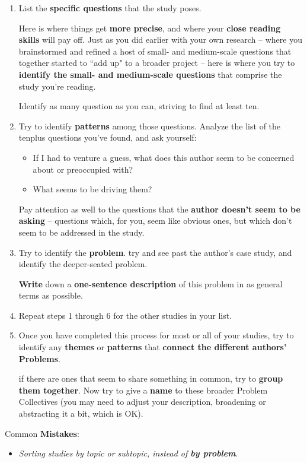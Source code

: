 \documentclass[11pt]{article}
\begin{document}
\begin{itemize}
\begin{exercise}
\begin{enumerate}
\item List the \textbf{specific questions} that the study poses.

Here is where things get \textbf{more precise}, and where your \textbf{close reading skills} will pay off. Just as you did earlier with your own research -- where you brainstormed and refined a host of small- and medium-scale questions that together started to ``add up" to a broader project -- here is where
you try to \textbf{identify the small- and medium-scale questions} that comprise the study you’re reading.

Identify as many question as you can, striving to find at least ten.

\item Try to identify \textbf{patterns} among those questions. Analyze the list of the tenplus questions you’ve found, and ask yourself:
\begin{itemize}
\item  If I had to venture a guess, what does this author seem to be concerned about or preoccupied with?
\item What seems to be driving them? 
\end{itemize} Pay attention as well to the questions that the \textbf{author doesn’t seem to be asking} -- questions which, for you, seem like obvious ones, but which don't seem to be addressed in the study.

\item Try to identify the \textbf{problem}. try and see past the author's case study, and identify the deeper-seated problem.

\textbf{Write} down a \textbf{one-sentence description} of this problem in as general terms as possible.

\item Repeat steps 1 through 6 for the other studies in your list.

\item Once you have completed this process for most or all of your studies, try to identify any \textbf{themes} or \textbf{patterns} that \textbf{connect the different authors' Problems}. 

if there are ones that seem to share something in common, try to \textbf{group them together}. Now try to give a \textbf{name} to these broader Problem Collectives (you may need to adjust your description, broadening or abstracting it a bit, which is OK). 
\end{enumerate}
\end{exercise}
Common \textbf{Mistakes}:
\begin{itemize}
\item \emph{Sorting studies by topic or subtopic, instead of \textbf{by problem}}.


\end{itemize}
\end{itemize}
\end{document}
